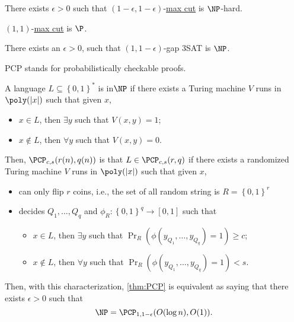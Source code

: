 \begin{theorem}
	There exists \(\epsilon > 0\) such that \((1-\epsilon , 1-\epsilon )\)-\hyperref[prb:max-cut]{max cut} is \(\NP\)-hard.
\end{theorem}

\begin{note}
	\((1, 1)\)-\hyperref[prb:max-cut]{max cut} is \(\P\).
\end{note}

\begin{theorem}\label{thm:PCP}
	There exists an \(\epsilon > 0\), such that \((1, 1-\epsilon )\)-gap 3SAT is \(\NP\).
\end{theorem}

PCP stands for probabilistically checkable proofs.

\begin{prev}[\(\NP\)]
	A language \(L \subseteq \left\{ 0, 1 \right\} ^{\ast}\) is in\(\NP\) if there exists a Turing machine \(V\) runs in \(\poly(\vert x \vert )\) such that given \(x\),
	\begin{itemize}
		\item \(x\in L\), then \(\exists y\) such that \(V(x, y) = 1\);
		\item \(x \notin L\), then \(\forall y\) such that \(V(x, y) = 0\).
	\end{itemize}
\end{prev}

Then, \(\PCP_{c, s}(r(n), q(n))\) is that \(L\in \PCP_{c, s}(r, q)\) if there exists a randomized Turing machine \(V\) runs in \(\poly(\vert x \vert )\) such that given \(x\),
\begin{itemize}
	\item can only flip \(r\) coins, i.e., the set of all random string is \(R=\left\{ 0, 1 \right\} ^r\)
	\item decides \(Q_1, \ldots  , Q_q\) and \(\phi _R\colon \left\{ 0, 1 \right\} ^q \to \left[ 0, 1 \right] \) such that
	      \begin{itemize}
		      \item \(x\in L\), then \(\exists y\) such that \(\Pr_{R}(\phi (y_{Q_1}, \ldots , y_{Q_q} ) = 1) \geq c\);
		      \item \(x\notin L\), then \(\forall y\) such that \(\Pr_{R}(\phi (y_{Q_1}, \ldots , y_{Q_q} ) = 1) < s\).
	      \end{itemize}
\end{itemize}

Then, with this characterization, \autoref{thm:PCP} is equivalent as saying that there exists \(\epsilon > 0\) such that
\[
	\NP = \PCP_{1, 1-\epsilon }(O(\log n), O(1)).
\]